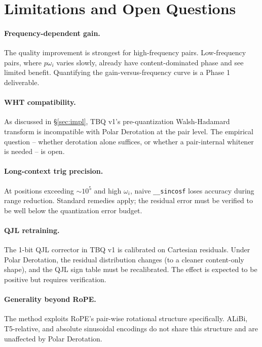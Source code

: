 \documentclass[10pt,twocolumn]{article}
\begin{document}
\section{Limitations and Open Questions}
\label{sec:limitations}

\paragraph{Frequency-dependent gain.}
The quality improvement is strongest for high-frequency pairs. Low-frequency pairs, where $p\omega_i$ varies slowly, already have content-dominated phase and see limited benefit. Quantifying the gain-versus-frequency curve is a Phase 1 deliverable.

\paragraph{WHT compatibility.}
As discussed in \S\ref{sec:impl}, TBQ v1's pre-quantization Walsh-Hadamard transform is incompatible with Polar Derotation at the pair level. The empirical question -- whether derotation alone suffices, or whether a pair-internal whitener is needed -- is open.

\paragraph{Long-context trig precision.}
At positions exceeding $\sim 10^5$ and high $\omega_i$, naive \texttt{\_\_sincosf} loses accuracy during range reduction. Standard remedies apply; the residual error must be verified to be well below the quantization error budget.

\paragraph{QJL retraining.}
The 1-bit QJL corrector in TBQ v1 is calibrated on Cartesian residuals. Under Polar Derotation, the residual distribution changes (to a cleaner content-only shape), and the QJL sign table must be recalibrated. The effect is expected to be positive but requires verification.

\paragraph{Generality beyond RoPE.}
The method exploits RoPE's pair-wise rotational structure specifically. ALiBi, T5-relative, and absolute sinusoidal encodings do not share this structure and are unaffected by Polar Derotation.
\end{document}
